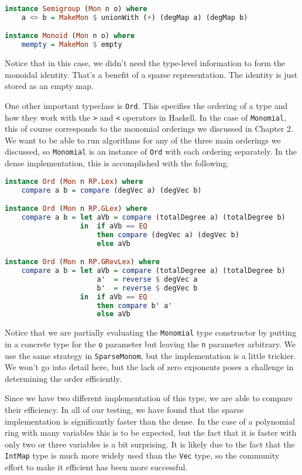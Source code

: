 \documentclass[MS, xcolor=dvipsnames]{wfuthesis}
\theoremstyle{definition}
\begin{document}
\begin{lstlisting}[language=Haskell]
instance Semigroup (Mon n o) where
    a <> b = MakeMon $ unionWith (+) (degMap a) (degMap b)

instance Monoid (Mon n o) where
    mempty = MakeMon $ empty
\end{lstlisting}
Notice that in this case, we didn't need the type-level information to form the monoidal identity. That's a benefit of a sparse representation. The identity is just stored as an empty map. \par
One other important typeclass is \lstinline{Ord}. This specifies the ordering of a type and how they work with the \lstinline{>} and \lstinline{<} operators in Haskell. In the case of \lstinline{Monomial}, this  of course corresponds to the monomial orderings we discussed in Chapter 2. We want to be able to run algorithms for any of the three main orderings we discussed, so \lstinline{Monomial} is an instance of \lstinline{Ord} with each ordering separately. In the dense implementation, this is accomplished with the following.
\begin{lstlisting}[language=Haskell]
instance Ord (Mon n RP.Lex) where
    compare a b = compare (degVec a) (degVec b)

instance Ord (Mon n RP.GLex) where
    compare a b = let aVb = compare (totalDegree a) (totalDegree b)
                  in  if aVb == EQ
                      then compare (degVec a) (degVec b)
                      else aVb

instance Ord (Mon n RP.GRevLex) where
    compare a b = let aVb = compare (totalDegree a) (totalDegree b)
                      a'  = reverse $ degVec a
                      b'  = reverse $ degVec b
                  in  if aVb == EQ
                      then compare b' a'
                      else aVb
\end{lstlisting}
Notice that we are partially evaluating the \lstinline{Monomial} type constructor by putting in a concrete type for the \lstinline{o} parameter but leaving the \lstinline{n} parameter arbitrary. We use the same strategy in \lstinline{SparseMonom}, but the implementation is a little trickier. We won't go into detail here, but the lack of zero exponents poses a challenge in determining the order efficiently. \par
Since we have two different implementation of this type, we are able to compare their efficiency. In all of our testing, we have found that the sparse implementation is significantly faster than the dense. In the case of a polynomial ring with many variables this is to be expected, but the fact that it is faster with only two or three variables is a bit surprising. It is likely due to the fact that the \lstinline{IntMap} type is much more widely used than the \lstinline{Vec} type, so the community effort to make it efficient has been more successful. \par
\end{document}
